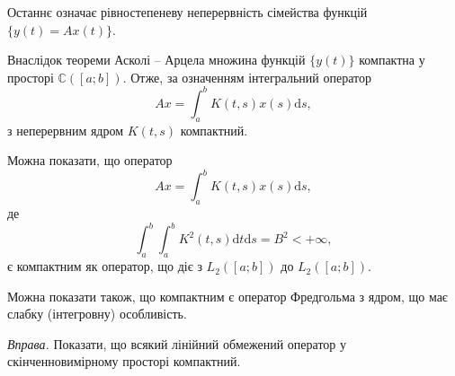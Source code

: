 \documentclass[14pt,twoside]{extreport}
\theoremstyle{mystyle}
\numberwithin{equation}{chapter}
\newcommand{\cab}{\mathbb{C}([a; b])}
\begin{document}
Останнє означає рівностепеневу неперервність сімейства функцій $\{y(t)=Ax(t)\}$.

Внаслідок теореми Асколі -- Арцела множина функцій $\{y(t)\}$ компактна у просторі $\cab$. Отже, за означенням інтегральний оператор
\[
Ax = \int_{a}^{b} K(t, s) x(s) \mathrm{d}s,
\]
з неперервним ядром $K(t, s)$ компактний.

Можна показати, що оператор
\[
Ax = \int_{a}^{b} K(t, s) x(s) \mathrm{d}s,
\]
де
\[
\int_{a}^{b}\int_{a}^{b}
K^2(t, s) \mathrm{d}t\mathrm{d}s = B^2<+\infty,
\]
є компактним як оператор, що діє з $L_2([a; b])$ до $L_2([a; b])$.

Можна показати також, що компактним є оператор Фредгольма з ядром, що має слабку (інтегровну) особливість.

\begin{small}
 \emph{Вправа.} Показати, що всякий лінійний обмежений оператор у скінченновимірному просторі компактний.
\end{small}
\end{document}
